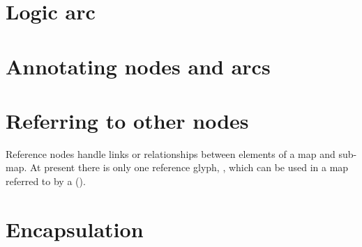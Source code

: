 




\section{Logic arc}
\label{sec:logic_arc}



\section{Annotating nodes and arcs}



\section{Referring to other nodes}
\label{sec:ref_nodes}

Reference nodes handle links or relationships between elements of a map and sub-map.
At present there is only one reference glyph, , which can be used in a map referred to by a  ().






\section{Encapsulation}
\label{sec:encapsulation}


